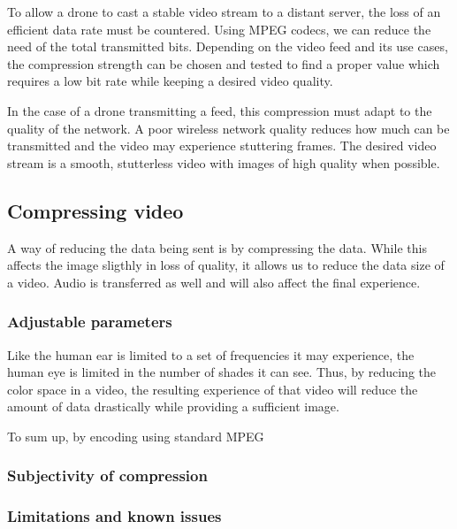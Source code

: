 To allow a drone to cast a stable video stream to a distant server, the loss of an efficient data rate must be countered. Using MPEG codecs, we can reduce the need of the total transmitted bits. Depending on the video feed and its use cases, the compression strength can be chosen and tested to find a proper value which requires a low bit rate while keeping a desired video quality.

In the case of a drone transmitting a feed, this compression must adapt to the quality of the network. A poor wireless network quality reduces how much can be transmitted and the video may experience stuttering frames. The desired video stream is a smooth, stutterless video with images of high quality when possible. 

\subsection{Compressing video}
A way of reducing the data being sent is by compressing the data. While this affects the image sligthly in loss of quality, it allows us to reduce the data size of a video. Audio is transferred as well and will also affect the final experience.

\subsubsection{Adjustable parameters}
Like the human ear is limited to a set of frequencies it may experience, the human eye is limited in the number of shades it can see. Thus, by reducing the color space in a video, the resulting experience of that video will reduce the amount of data drastically while providing a sufficient image.

To sum up, by encoding using standard MPEG

\subsubsection{Subjectivity of compression}

\subsubsection{Limitations and known issues}

